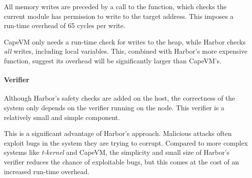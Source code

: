 All memory writes are preceded by a call to the  function, which checks the current module has permission to write to the target address. This imposes a run-time overhead of 65 cycles per write.

CapeVM only needs a run-time check for writes to the heap, while Harbor checks \emph{all} writes, including local variables. This, combined with Harbor's more expensive  function, suggest its overhead will be significantly larger than CapeVM's.

\paragraph{Verifier}
Although Harbor's safety checks are added on the host, the correctness of the system only depends on the verifier running on the node. This verifier is a relatively small and simple component.

This is a significant advantage of Harbor's approach. Malicious attacks often exploit bugs in the system they are trying to corrupt. Compared to more complex systems like \emph{t-kernel} and CapeVM, the simplicity and small size of Harbor's verifier reduces the chance of exploitable bugs, but this comes at the cost of an increased run-time overhead.

